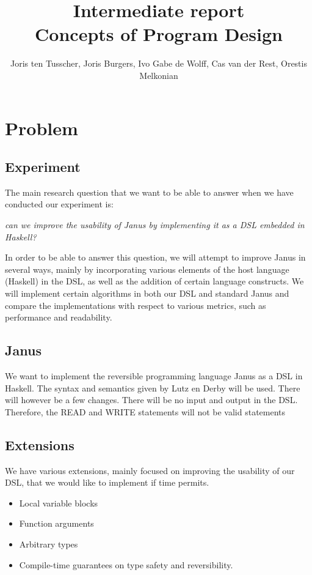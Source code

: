 \documentclass[12pt,a4paper]{article}
\title{\textbf{Intermediate report \\ \small{Concepts of Program Design}}}
\author{\small{Joris ten Tusscher, Joris Burgers, Ivo Gabe de Wolff, Cas van der Rest, Orestis Melkonian}}
\date{}
\begin{document}
\maketitle


\section{Problem}
    \subsection{Experiment}
    The main research question that we want to be able to answer when we have conducted our experiment is:
    
    \begin{displayquote}
    \textit{can we improve the usability of Janus by implementing it as a DSL embedded in Haskell?}
    \end{displayquote}
    
    \noindent In order to be able to answer this question, we will attempt to improve Janus in several ways, mainly by incorporating various elements of the host language (Haskell) in the DSL, as well as the addition of certain language constructs. 
    We will implement certain algorithms in both our DSL and standard Janus and compare the implementations with respect to various metrics, such as performance and readability. 
    
    \subsection{Janus}
    We want to implement the reversible programming language Janus as a DSL in Haskell. The syntax and semantics given by Lutz en Derby \cite{lutz82} will be used. There will however be a few changes. There will be no input and output in the DSL. Therefore, the READ and WRITE statements will not be valid statements
    
    \subsection{Extensions}
    We have various extensions, mainly focused on improving the usability of our DSL, that we would like to implement if time permits.
    
\begin{itemize}
\item 
Local variable blocks
\item
Function arguments
\item
Arbitrary types
\item
Compile-time guarantees on type safety and reversibility. 
\end{itemize}
    
\end{document}
